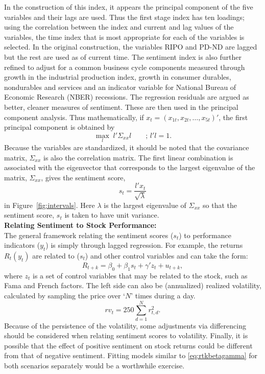 In the construction of this index, it appears the principal component of the five variables and their lags are used. Thus the first stage index has ten loadings; using the correlation between the index and current and lag values of the variables, the time index that is most appropriate for each of the variables is selected. In the original construction, the variables RIPO and PD-ND are lagged but the rest are used as of current time. The sentiment index is also further refined to adjust for a common business cycle components measured through growth in the industrial production index, growth in consumer durables, nondurables and services and an indicator variable for National Bureau of Economic Research (NBER) recessions. The regression residuals are argued as better, cleaner measures of sentiment. These are then used in the principal component analysis. Thus mathematically, if $x_t= (x_{1t}, x_{2t}, \ldots, x_{5t})'$, the first principal component is obtained by
	\begin{equation}
	\max_l \; l' \textstyle \Sigma_{xx} l \qquad ; \, l'l=1 .
	\end{equation}
Because the variables are standardized, it should be noted that the covariance matrix, $\Sigma_{xx}$ is also the correlation matrix. The first linear combination is associated with the eigenvector that corresponds to the largest eigenvalue of the matrix, $\Sigma_{xx}$, gives the sentiment score,
	\begin{equation} \label{eq:stsqlambda}
	s_t= \dfrac{l' x_t}{\sqrt{\lambda}}
	\end{equation}
in Figure~\ref{fig:intervals}. Here $\lambda$ is the largest eigenvalue of $\Sigma_{xx}$ so that the sentiment score, $s_t$ is taken to have unit variance. \\


\noindent\textbf{Relating Sentiment to Stock Performance:} \\


The general framework relating the sentiment scores ($s_t$) to performance indicators ($y_t$) is simply through lagged regression. For example, the returns $R_t(y_t)$ are related to ($s_t$) and other control variables and can take the form:
	\begin{equation} \label{eq:rtkbetagamma}
	R_{t+k}= \beta_0 + \beta_1 s_t + \gamma' z_t + u_{t+k},
	\end{equation}
where $z_t$ is a set of control variables that may be related to the stock, such as Fama and French factors. The left side can also be (annualized) realized volatility, calculated by sampling the price over `$N$' times during a day. 
	\begin{equation}
	rv_t = 250 \sum_{d=1}^N r_{t,d}^2.
	\end{equation}
Because of the persistence of the volatility, some adjustments via differencing should be considered when relating sentiment scores to volatility. Finally, it is possible that the effect of positive sentiment on stock returns could be different from that of negative sentiment. Fitting models similar to \eqref{eq:rtkbetagamma} for both scenarios separately would be a worthwhile exercise. \\


